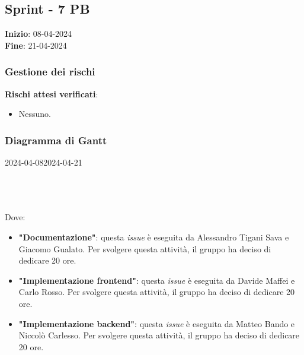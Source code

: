 \subsection{Sprint - 7 PB}
\textbf{Inizio}: 08-04-2024 \\
\textbf{Fine}: 21-04-2024

\subsubsection{Gestione dei rischi}
\textbf{Rischi attesi verificati}:

\begin{itemize}
	\item Nessuno.
\end{itemize}

\subsubsection{Diagramma di Gantt}

\begin{ganttchart}[
		x unit=0.6cm, %
		y unit chart=0.6cm,
		bar/.style={fill=blue!50},
		bar height=0.5,
		time slot format=isodate,
		time slot unit=day,
		vgrid,
		today=2024-04-08,
		today rule/.style={draw=red, ultra thick}
	]{2024-04-08}{2024-04-21}
	 \\
	 \\
	 \\
	 \\
\end{ganttchart}

Dove:
\begin{itemize}
	\item \textbf{"Documentazione"}: questa \textit{issue} è eseguita da
	      Alessandro Tigani Sava e Giacomo Gualato. Per svolgere questa attività, il gruppo ha deciso di
	      dedicare 20 ore.
	\item \textbf{"Implementazione frontend"}: questa \textit{issue} è eseguita
	      da Davide Maffei e Carlo Rosso. Per svolgere questa attività, il
	      gruppo ha deciso di dedicare 20 ore.
	\item \textbf{"Implementazione backend"}: questa \textit{issue} è eseguita da Matteo Bando e Niccolò Carlesso. Per svolgere questa attività, il
	      gruppo ha deciso di dedicare 20 ore.
\end{itemize}

